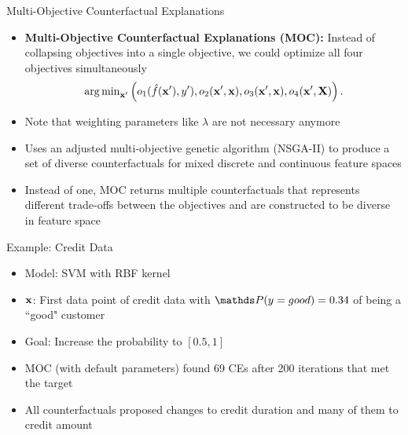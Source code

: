 \documentclass[11pt,compress,t,notes=noshow, aspectratio=169, xcolor=table]{beamer}
\begin{document}
\begin{frame}{Multi-Objective Counterfactual Explanations }
	\begin{itemize}
		\item \textbf{Multi-Objective Counterfactual Explanations (MOC):} Instead of collapsing objectives into a single objective, we could optimize all four objectives simultaneously
	$$	\argmin_{\xv'} \left(o_1(\fh(\xv'), y'), o_2(\xv', \xv), o_3(\xv', \xv), o_4(\xv', \Xmat) \right). $$
		
		\item Note that weighting parameters like $\lambda$ are not necessary anymore
		\item Uses an adjusted multi-objective genetic algorithm (NSGA-II) to produce a set of diverse counterfactuals for mixed discrete and continuous feature spaces
		\item Instead of one, MOC returns multiple counterfactuals that represents different trade-offs between the objectives and are constructed to be diverse in feature space
	\end{itemize}

\end{frame}

\begin{frame}{Example: Credit Data}
	\begin{itemize}
		\item Model: SVM with RBF kernel
		\item $\xv$: First data point of credit data with $\P(y = good)  = 0.34$ of being a ``good" customer
		\item Goal: Increase the probability to $[0.5, 1]$
		\item MOC (with default parameters) found 69 CEs after 200 iterations that met the target
		\item All counterfactuals proposed changes to credit duration and many of them to credit amount
	\end{itemize}
\end{frame}
\end{document}
